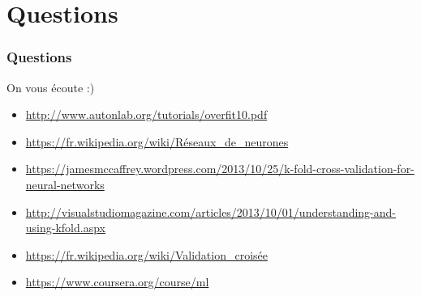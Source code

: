 \documentclass[handout]{beamer}
\begin{document}
	\section{Questions}
		\begin{frame}
		\frametitle{Questions}
		On vous écoute :)
		\vspace{40px}
		\tiny{
			\begin{itemize}
				\item \url{http://www.autonlab.org/tutorials/overfit10.pdf}
				\item \url{https://fr.wikipedia.org/wiki/Réseaux\_de\_neurones}
				\item \url{https://jamesmccaffrey.wordpress.com/2013/10/25/k-fold-cross-validation-for-neural-networks}
				\item \url{http://visualstudiomagazine.com/articles/2013/10/01/understanding-and-using-kfold.aspx}
				\item \url{https://fr.wikipedia.org/wiki/Validation\_croisée}
				\item \url{https://www.coursera.org/course/ml}
			\end{itemize}
		}
		\end{frame}


\end{document}
